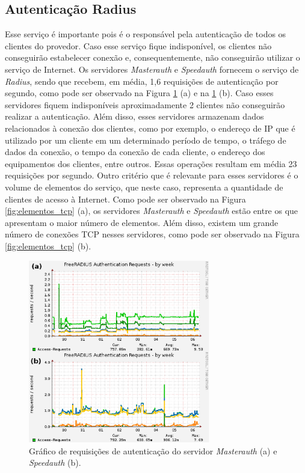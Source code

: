 \subsection{Autenticação Radius}
\label{section:radius}

Esse serviço é importante pois é o responsável pela autenticação de todos os clientes do provedor. Caso esse serviço fique indisponível, 
os clientes não conseguirão estabelecer conexão e, consequentemente, não conseguirão utilizar o serviço de Internet. Os servidores 
\textit{Masterauth} e \textit{Speedauth} fornecem o serviço de \textit{Radius}, sendo que recebem, em média, 1,6 requisições de autenticação 
por segundo, como pode ser observado na Figura \ref{fig:freeradius_auth} (a) e na \ref{fig:freeradius_auth} (b). Caso esses servidores fiquem 
indisponíveis aproximadamente 2 clientes não conseguirão realizar a autenticação. Além disso, esses servidores armazenam dados relacionados à 
conexão dos clientes, como por exemplo, o endereço de \ac{IP} que é utilizado por um cliente em um determinado período de tempo, o tráfego de 
dados da conexão, o tempo da conexão de cada cliente, o endereço  dos equipamentos dos clientes, entre outros. Essas operações resultam 
em média 23 requisições por segundo. %
Outro critério que é relevante para esses servidores é o volume de elementos do serviço, que neste caso, representa a quantidade de clientes de
acesso à Internet. Como pode ser observado na Figura \ref{fig:elementos_tcp} (a), os servidores \textit{Masterauth} e \textit{Speedauth}
estão entre os que apresentam o maior número de elementos. Além disso, existem um grande número de conexões \ac{TCP} nesses servidores, como 
pode ser observado na Figura \ref{fig:elementos_tcp} (b).

\begin{figure}[h!]
 \centering
 \includegraphics[width=300px]{img/freeradius_auth.eps}
 \caption{Gráfico de requisições de autenticação do servidor \textit{Masterauth} (a) e \textit{Speedauth} (b).}
 \label{fig:freeradius_auth}
\end{figure}

